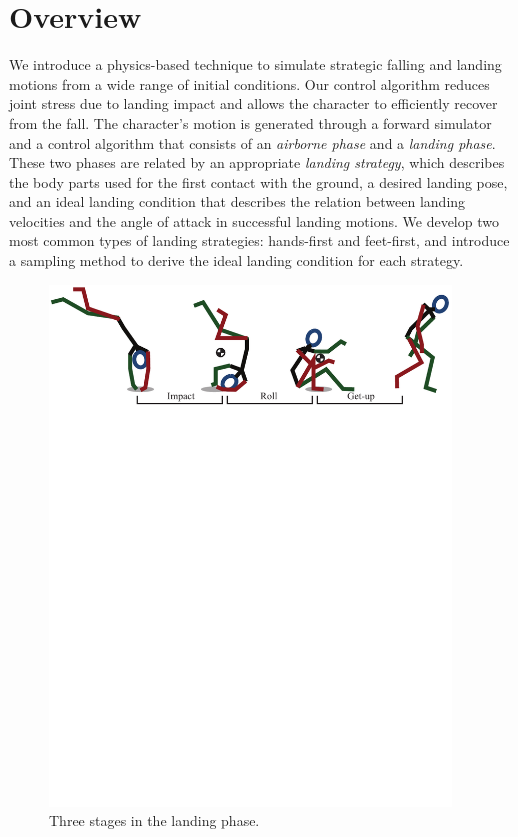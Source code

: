 \section{Overview}

We introduce a physics-based technique to simulate strategic falling
and landing motions from a wide range of initial conditions. Our
control algorithm reduces joint stress due to landing impact and
allows the character to efficiently recover from the fall. The
character's motion is generated through a forward simulator and a
control algorithm that consists of an \emph{airborne phase} and a
\emph{landing phase}. These two phases are related by an appropriate
\emph{landing strategy}, which describes the body parts used for the
first contact with the ground, a desired landing pose, and an ideal
landing condition that describes the relation between landing
velocities and the angle of attack in successful landing motions. We
develop two most common types of landing strategies: hands-first and
feet-first, and introduce a sampling method to derive the ideal
landing condition for each strategy.

\begin{figure}
\center
  \includegraphics[width=4.2in]{images/landingPhase}
  \caption{Three stages in the landing phase.}
 \label{fig:landing_landingPhase}
\end{figure}

